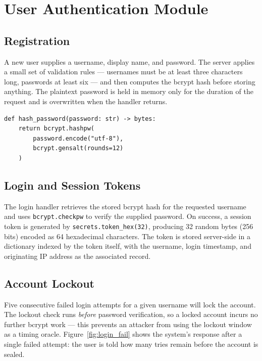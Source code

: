 \documentclass[conference]{IEEEtran}
\begin{document}
\section{User Authentication Module}
\label{sec:auth}

\subsection{Registration}
A new user supplies a username, display name, and password. The server applies a small set of validation rules --- usernames must be at least three characters long, passwords at least six --- and then computes the bcrypt hash before storing anything. The plaintext password is held in memory only for the duration of the request and is overwritten when the handler returns.

\begin{lstlisting}[caption={Password hashing routine.}]
def hash_password(password: str) -> bytes:
    return bcrypt.hashpw(
        password.encode("utf-8"),
        bcrypt.gensalt(rounds=12)
    )
\end{lstlisting}

\subsection{Login and Session Tokens}
The login handler retrieves the stored bcrypt hash for the requested username and uses \texttt{bcrypt.checkpw} to verify the supplied password. On success, a session token is generated by \texttt{secrets.token\_hex(32)}, producing 32 random bytes (256 bits) encoded as 64 hexadecimal characters. The token is stored server-side in a dictionary indexed by the token itself, with the username, login timestamp, and originating IP address as the associated record.

\subsection{Account Lockout}
Five consecutive failed login attempts for a given username will lock the account. The lockout check runs \emph{before} password verification, so a locked account incurs no further bcrypt work --- this prevents an attacker from using the lockout window as a timing oracle. Figure~\ref{fig:login_fail} shows the system's response after a single failed attempt: the user is told how many tries remain before the account is sealed.
\end{document}
